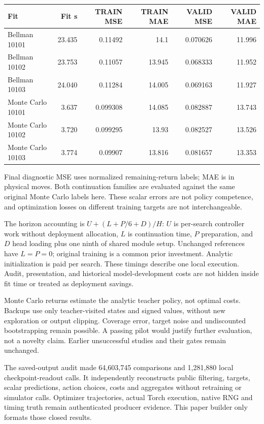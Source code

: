 \documentclass[10pt]{article}
\begin{document}
{\small\centering\par
\begin{tabular}{lrrrrr}
\toprule
Fit & Fit s & TRAIN MSE & TRAIN MAE & VALID MSE & VALID MAE \\ \midrule
Bellman 10101 & 23.435 & 0.11492 & 14.1 & 0.070626 & 11.996 \\
Bellman 10102 & 23.753 & 0.11057 & 13.945 & 0.068333 & 11.952 \\
Bellman 10103 & 24.040 & 0.11284 & 14.005 & 0.069163 & 11.927 \\
Monte Carlo 10101 & 3.637 & 0.099308 & 14.085 & 0.082887 & 13.743 \\
Monte Carlo 10102 & 3.720 & 0.099295 & 13.93 & 0.082527 & 13.526 \\
Monte Carlo 10103 & 3.774 & 0.09907 & 13.816 & 0.081657 & 13.353 \\
\bottomrule
\end{tabular}
\par}
Final diagnostic MSE uses normalized remaining-return labels; MAE is in physical moves. Both continuation families are evaluated against the same original Monte Carlo labels here. These scalar errors are not policy competence, and optimization losses on different training targets are not interchangeable.\par
The horizon accounting is $U+(L+P/6+D)/H$: $U$ is per-search controller work without deployment allocation, $L$ is continuation time, $P$ preparation, and $D$ head loading plus one ninth of shared module setup. Unchanged references have $L=P=0$; original training is a common prior investment. Analytic initialization is paid per search. These timings describe one local execution. Audit, presentation, and historical model-development costs are not hidden inside fit time or treated as deployment savings.\par
Monte Carlo returns estimate the analytic teacher policy, not optimal costs. Backups use only teacher-visited states and signed values, without new exploration or output clipping. Coverage error, target noise and undiscounted bootstrapping remain possible. A passing pilot would justify further evaluation, not a novelty claim. Earlier unsuccessful studies and their gates remain unchanged.\par
The saved-output audit made 64,603,745 comparisons and 1,281,880 local checkpoint-readout calls. It independently reconstructs public filtering, targets, scalar predictions, action choices, costs and aggregates without retraining or simulator calls. Optimizer trajectories, actual Torch execution, native RNG and timing truth remain authenticated producer evidence. This paper builder only formats those closed results.\par
\end{document}
